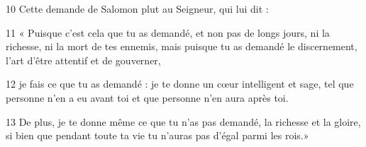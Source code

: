 
10 Cette demande de Salomon plut au Seigneur, qui lui dit :

11 « Puisque c’est cela que tu as demandé, et non pas de longs jours, ni la richesse, ni la mort de tes ennemis, mais puisque tu as demandé le discernement, l’art d’être attentif et de gouverner,

12 je fais ce que tu as demandé : je te donne un cœur intelligent et sage, tel que personne n’en a eu avant toi et que personne n’en aura après toi.

13 De plus, je te donne même ce que tu n’as pas demandé, la richesse et la gloire, si bien que pendant toute ta vie tu n’auras pas d’égal parmi les rois.»